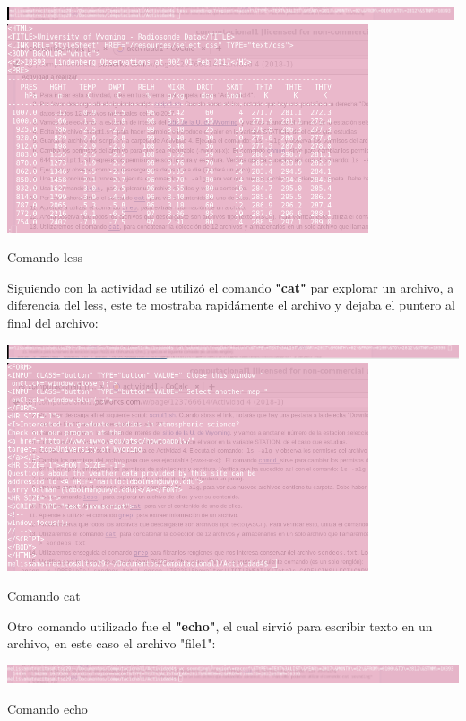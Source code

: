 \documentclass{article}
\begin{document}
\begin{center}

 \includegraphics[width=0.99\textwidth]{less2.PNG}
 \includegraphics[width=0.8\textwidth]{less1.png}

Comando less

\end{center}

Siguiendo con la actividad se utilizó el comando \textbf{"cat"} par explorar un archivo, a diferencia del less, este te mostraba rapidámente el archivo y dejaba el puntero al final del archivo:
\begin{center}
 \includegraphics[width=1\textwidth]{cat1.PNG}
 \includegraphics[width=0.8\textwidth]{cat2.png}

Comando cat

\end{center}

Otro comando utilizado fue el \textbf{"echo"}, el cual sirvió para escribir texto en un archivo, en este caso el archivo "file1":

\begin{center}
 \includegraphics[width=1\textwidth]{echo.png}

Comando echo

\end{center}
\end{document}
